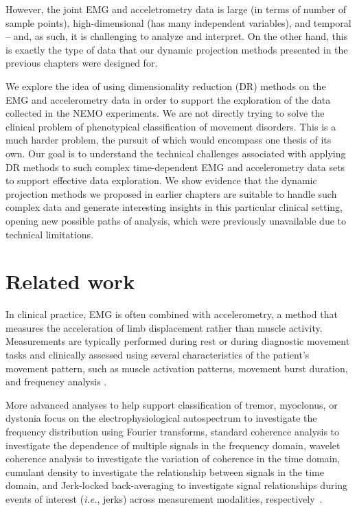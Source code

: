 However, the joint EMG and acceletrometry data is large (in terms of number of sample points), high-dimensional (has many independent variables), and temporal -- and, as such, it is challenging to analyze and interpret. On the other hand, this is exactly the type of data that our dynamic projection methods presented in the previous chapters were designed for.

We explore the idea of using dimensionality reduction (DR) methods on the EMG and accelerometry data in order to support the exploration of the data collected in the NEMO experiments. We are not directly trying to solve the clinical problem of phenotypical classification of movement disorders. This is a much harder problem, the pursuit of which would encompass one thesis of its own. Our goal is to understand the technical challenges associated with applying DR methods to such complex time-dependent EMG and accelerometry data sets to support effective data exploration. We show evidence that the dynamic projection methods we proposed in earlier chapters are suitable to handle such complex data and generate interesting insights in this particular clinical setting, opening new possible paths of analysis, which were previously unavailable due to technical limitations. 


\section{Related work}
\label{sec:nemo_related}
%
In clinical practice, EMG is often combined with accelerometry, a method that measures the acceleration of limb displacement rather than muscle activity. Measurements are typically performed during rest or during diagnostic movement tasks and clinically assessed using several characteristics of the patient’s movement pattern, such as muscle activation patterns, movement burst duration, and frequency analysis \citep{VANDERVEEN2021176}.

More advanced analyses to help support classification of tremor, myoclonus, or dystonia focus on the electrophysiological autospectrum to investigate the frequency distribution using Fourier transforms, standard coherence analysis to investigate the dependence of multiple signals in the frequency domain, wavelet coherence analysis to investigate the variation of coherence in the time domain, cumulant density to investigate the relationship between signals in the time domain, and Jerk-locked back-averaging to investigate signal relationships during events of interest (\emph{i.e.}, jerks) across measurement modalities, respectively~\citep{nijmeijer2014emg, tijssen2000frequency, grosse2004patterns, kramer2018wavelet, Stouwe2015, grosse2003abnormal}.

